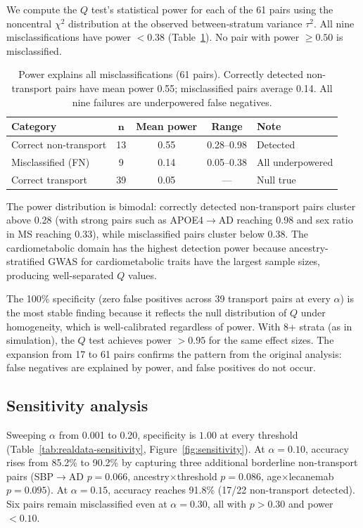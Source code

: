 \documentclass{article}
\begin{document}
We compute the $Q$ test's statistical power for each of the 61 pairs using the noncentral $\chi^2$ distribution at the observed between-stratum variance $\tau^2$. All nine misclassifications have power $< 0.38$ (Table~\ref{tab:realdata-power}). No pair with power $\geq 0.50$ is misclassified.

\begin{table}[t]
\centering
\caption{Power explains all misclassifications (61 pairs). Correctly detected non-transport pairs have mean power 0.55; misclassified pairs average 0.14. All nine failures are underpowered false negatives.}
\label{tab:realdata-power}
\small
\begin{tabular}{@{}lcccl@{}}
\toprule
\textbf{Category} & $\boldsymbol{n}$ & \textbf{Mean power} & \textbf{Range} & \textbf{Note} \\
\midrule
Correct non-transport & 13 & 0.55 & 0.28--0.98 & Detected \\
Misclassified (FN) & 9 & 0.14 & 0.05--0.38 & All underpowered \\
Correct transport & 39 & 0.05 & --- & Null true \\
\bottomrule
\end{tabular}
\end{table}

The power distribution is bimodal: correctly detected non-transport pairs cluster above 0.28 (with strong pairs such as APOE4$\to$AD reaching 0.98 and sex ratio in MS reaching 0.33), while misclassified pairs cluster below 0.38. The cardiometabolic domain has the highest detection power because ancestry-stratified GWAS for cardiometabolic traits have the largest sample sizes, producing well-separated $Q$ values.

The 100\% specificity (zero false positives across 39 transport pairs at every $\alpha$) is the most stable finding because it reflects the null distribution of $Q$ under homogeneity, which is well-calibrated regardless of power.
With 8+ strata (as in simulation), the $Q$ test achieves power $> 0.95$ for the same effect sizes. The expansion from 17 to 61 pairs confirms the pattern from the original analysis: false negatives are explained by power, and false positives do not occur.

\subsection{Sensitivity analysis}
\label{sec:realdata-sensitivity}

Sweeping $\alpha$ from 0.001 to 0.20, specificity is $1.00$ at every threshold (Table~\ref{tab:realdata-sensitivity}, Figure~\ref{fig:sensitivity}). At $\alpha = 0.10$, accuracy rises from 85.2\% to 90.2\% by capturing three additional borderline non-transport pairs (SBP$\to$AD $p = 0.066$, ancestry$\times$threshold $p = 0.086$, age$\times$lecanemab $p = 0.095$). At $\alpha = 0.15$, accuracy reaches 91.8\% (17/22 non-transport detected). Six pairs remain misclassified even at $\alpha = 0.30$, all with $p > 0.30$ and power $< 0.10$.
\end{document}
